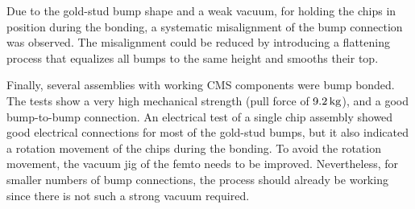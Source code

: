 Due to the gold-stud bump shape and a weak vacuum, for holding the chips in position during the bonding, a systematic misalignment of the bump connection was observed. The misalignment could be reduced by introducing a flattening process that equalizes all bumps to the same height and smooths their top.

Finally, several assemblies with working \ac{CMS} components were bump bonded. The tests show a very high mechanical strength (pull force of $9.2\,\rm{kg}$), and a good bump-to-bump connection. An electrical test of a single chip assembly showed good electrical connections for most of the gold-stud bumps, but it also indicated a rotation movement of the chips during the bonding. To avoid the rotation movement, the vacuum jig of the femto needs to be improved. Nevertheless, for smaller numbers of bump connections, the process should already be working since there is not such a strong vacuum required.